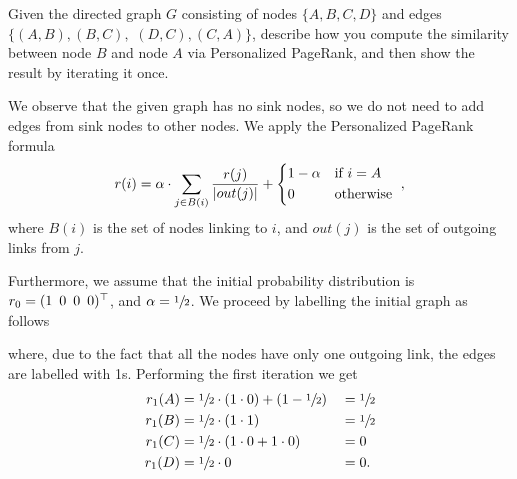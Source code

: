 \exercise

Given the directed graph $G$ consisting of nodes $\{A, B, C, D\}$ and edges
$\{(A,B), (B,C),$ $ (D,C), (C,A)\}$, describe how you compute the similarity
between node $B$ and node $A$ via Personalized PageRank, and then show the
result by iterating it once.

\solution

We observe that the given graph has no sink nodes, so we do not need to add
edges from sink nodes to other nodes. We apply the Personalized PageRank formula
%
\begin{equation*}
  r(i) = \alpha\cdot\sum_{j\in B(i)} \frac{r(j)}{|out(j)|} +
  \begin{cases*}
    1-\alpha & if $i=A$ \\
    0        & otherwise
  \end{cases*},
\end{equation*}
%
where $B(i)$ is the set of nodes linking to $i$, and $out(j)$ is the set of
outgoing links from $j$.

Furthermore, we assume that the initial probability distribution is
$r_0=(1 \enskip 0 \enskip 0 \enskip 0)^\top$, and $\alpha=\sfrac{1}{2}$. We
proceed by labelling the initial graph as follows
%
\begin{center}
\end{center}
%
where, due to the fact that all the nodes have only one outgoing link, the edges
are labelled with 1s. Performing the first iteration we get
%
\begin{alignat*}{3}
  r_1(A) &= \sfrac{1}{2} \cdot (1\cdot0) + (1-\sfrac{1}{2}) &&= \sfrac{1}{2} \\
  r_1(B) &= \sfrac{1}{2} \cdot (1\cdot1)                    &&= \sfrac{1}{2} \\
  r_1(C) &= \sfrac{1}{2} \cdot (1\cdot0+1\cdot0)            && = 0 \\
  r_1(D) &= \sfrac{1}{2} \cdot 0                            &&= 0.
\end{alignat*}

